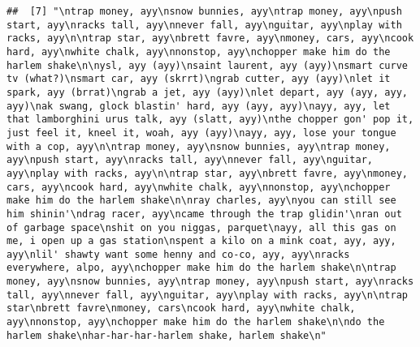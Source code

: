 \documentclass[]{article}
\begin{document}
\begin{verbatim}
##  [7] "\ntrap money, ayy\nsnow bunnies, ayy\ntrap money, ayy\npush start, ayy\nracks tall, ayy\nnever fall, ayy\nguitar, ayy\nplay with racks, ayy\n\ntrap star, ayy\nbrett favre, ayy\nmoney, cars, ayy\ncook hard, ayy\nwhite chalk, ayy\nnonstop, ayy\nchopper make him do the harlem shake\n\nysl, ayy (ayy)\nsaint laurent, ayy (ayy)\nsmart curve tv (what?)\nsmart car, ayy (skrrt)\ngrab cutter, ayy (ayy)\nlet it spark, ayy (brrat)\ngrab a jet, ayy (ayy)\nlet depart, ayy (ayy, ayy, ayy)\nak swang, glock blastin' hard, ayy (ayy, ayy)\nayy, ayy, let that lamborghini urus talk, ayy (slatt, ayy)\nthe chopper gon' pop it, just feel it, kneel it, woah, ayy (ayy)\nayy, ayy, lose your tongue with a cop, ayy\n\ntrap money, ayy\nsnow bunnies, ayy\ntrap money, ayy\npush start, ayy\nracks tall, ayy\nnever fall, ayy\nguitar, ayy\nplay with racks, ayy\n\ntrap star, ayy\nbrett favre, ayy\nmoney, cars, ayy\ncook hard, ayy\nwhite chalk, ayy\nnonstop, ayy\nchopper make him do the harlem shake\n\nray charles, ayy\nyou can still see him shinin'\ndrag racer, ayy\ncame through the trap glidin'\nran out of garbage space\nshit on you niggas, parquet\nayy, all this gas on me, i open up a gas station\nspent a kilo on a mink coat, ayy, ayy, ayy\nlil' shawty want some henny and co-co, ayy, ayy\nracks everywhere, alpo, ayy\nchopper make him do the harlem shake\n\ntrap money, ayy\nsnow bunnies, ayy\ntrap money, ayy\npush start, ayy\nracks tall, ayy\nnever fall, ayy\nguitar, ayy\nplay with racks, ayy\n\ntrap star\nbrett favre\nmoney, cars\ncook hard, ayy\nwhite chalk, ayy\nnonstop, ayy\nchopper make him do the harlem shake\n\ndo the harlem shake\nhar-har-har-harlem shake, harlem shake\n"                                                                                                                                                                                                                                                                                                                                                                                                                                                                                                                                                                                                                                                                                                                                                                                                                                                                                                                                                                                                                                                                                                                                                                                                                                                                                                                                                                                                                                                                                                                                                                                                                                                                                                      
\end{verbatim}
\end{document}
